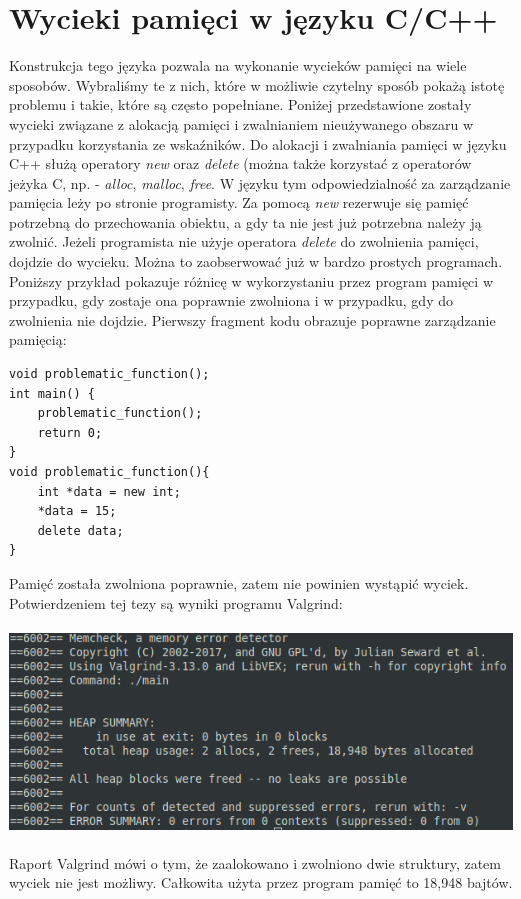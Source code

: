 \documentclass[12pt]{article}
\begin{document}
\section{Wycieki pamięci w języku C/C++}
Konstrukcja tego języka pozwala na wykonanie wycieków pamięci na wiele sposobów. Wybraliśmy te z nich, które w możliwie czytelny sposób pokażą istotę problemu i takie, które są często popełniane. Poniżej przedstawione zostały wycieki związane z alokacją pamięci i zwalnianiem nieużywanego obszaru w przypadku korzystania ze wskaźników.
Do alokacji i zwalniania pamięci w języku C++ służą operatory \textit{new} oraz \textit{delete} (można także korzystać z operatorów jeżyka C, np. - \textit{alloc}, \textit{malloc}, \textit{free}. W języku tym odpowiedzialność za zarządzanie pamięcia leży po stronie programisty. Za pomocą \textit{new} rezerwuje się pamięć potrzebną do przechowania obiektu, a gdy ta nie jest już potrzebna należy ją zwolnić. Jeżeli programista nie użyje operatora \textit{delete} do zwolnienia pamięci, dojdzie do wycieku. Można to zaobserwować już w bardzo prostych programach. Poniższy przykład pokazuje różnicę w wykorzystaniu przez program pamięci w przypadku, gdy zostaje ona poprawnie zwolniona i w przypadku, gdy do zwolnienia nie dojdzie. Pierwszy fragment kodu obrazuje poprawne zarządzanie pamięcią:
\begin{lstlisting}
void problematic_function();
int main() {
    problematic_function();
    return 0;
}
void problematic_function(){
    int *data = new int;
    *data = 15;
    delete data;
}
\end{lstlisting}
Pamięć została zwolniona poprawnie, zatem nie powinien wystąpić wyciek. Potwierdzeniem tej tezy są wyniki programu Valgrind: \\\\
\includegraphics[scale=0.7]{cpp1nlVal} \\\\
Raport Valgrind mówi o tym, że zaalokowano i zwolniono dwie struktury, zatem wyciek nie jest możliwy. Całkowita użyta przez program pamięć to 18,948 bajtów. 
\end{document}
